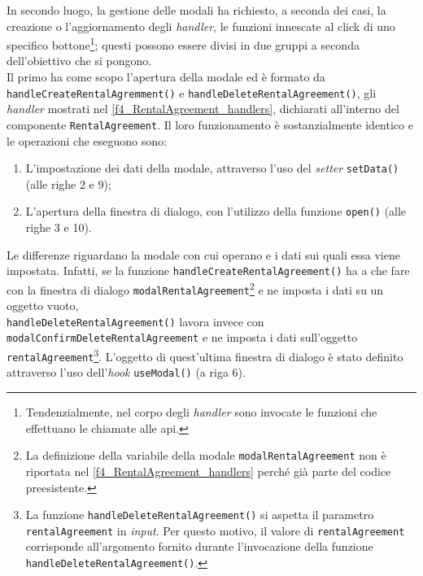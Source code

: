 In secondo luogo, la gestione delle modali ha richiesto, a seconda dei casi, la creazione o l'aggiornamento degli \textit{handler}, le funzioni innescate al click di uno specifico bottone\footnote{Tendenzialmente, nel corpo degli \textit{handler} sono invocate le funzioni che effettuano le chiamate alle \gls{api}.}; questi possono essere divisi in due gruppi a seconda dell'obiettivo che si pongono.\\
Il primo ha come scopo l'apertura della modale ed è formato da \\\texttt{handleCreateRentalAgremment()} e \texttt{handleDeleteRentalAgreement()}, gli \textit{handler} mostrati nel \autoref{f4_RentalAgreement_handlers}, dichiarati all'interno del componente \texttt{RentalAgreement}. Il loro funzionamento è sostanzialmente identico e le operazioni che eseguono sono:
\begin{enumerate}
    \item L'impostazione dei dati della modale, attraverso l'uso del \textit{setter} \texttt{setData()} (alle righe 2 e 9);
    
    \item L'apertura della finestra di dialogo, con l'utilizzo della funzione \texttt{open()} (alle righe 3 e 10).
\end{enumerate}
Le differenze riguardano la modale con cui operano e i dati sui quali essa viene impostata. Infatti, se la funzione \texttt{handleCreateRentalAgreement()} ha a che fare con la finestra di dialogo \texttt{modalRentalAgreement}\footnote{La definizione della variabile della modale \texttt{modalRentalAgreement} non è riportata nel \autoref{f4_RentalAgreement_handlers} perché già parte del codice preesistente.} e ne imposta i dati su un oggetto vuoto, \\\texttt{handleDeleteRentalAgreement()} lavora invece con \texttt{modalConfirmDeleteRentalAgreement} e ne imposta i dati sull'oggetto \texttt{rentalAgreement}\footnote{La funzione \texttt{handleDeleteRentalAgreement()} si aspetta il parametro  \texttt{rentalAgreement} in \textit{input}. Per questo motivo, il valore di \texttt{rentalAgreement} corrisponde all'argomento fornito durante l'invocazione della funzione \texttt{handleDeleteRentalAgreement()}.}.
L'oggetto di quest'ultima finestra di dialogo è stato definito attraverso l'uso dell'\textit{hook} \texttt{useModal()} (a riga 6).

